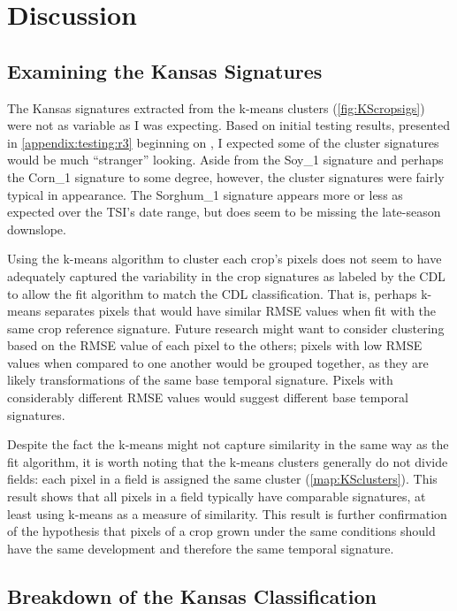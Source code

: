 \chapter{Discussion}
\label{discussion}

\section{Examining the Kansas Signatures}
\label{discussion:kssigs}

The Kansas signatures extracted from the k-means clusters (\autoref{fig:KScropsigs}) were not as variable as I was expecting. Based on initial testing results, presented in \autoref{appendix:testing:r3} beginning on , I expected some of the cluster signatures would be much ``stranger'' looking. Aside from the Soy\_1 signature and perhaps the Corn\_1 signature to some degree, however, the cluster signatures were fairly typical in appearance. The Sorghum\_1 signature appears more or less as expected over the TSI's date range, but does seem to be missing the late-season downslope.

Using the k-means algorithm to cluster each crop's pixels does not seem to have adequately captured the variability in the crop signatures as labeled by the CDL to allow the fit algorithm to match the CDL classification. That is, perhaps k-means separates pixels that would have similar RMSE values when fit with the same crop reference signature. Future research might want to consider clustering based on the RMSE value of each pixel to the others; pixels with low RMSE values when compared to one another would be grouped together, as they are likely transformations of the same base temporal signature. Pixels with considerably different RMSE values would suggest different base temporal signatures.

Despite the fact the k-means might not capture similarity in the same way as the fit algorithm, it is worth noting that the k-means clusters generally do not divide fields: each pixel in a field is assigned the same cluster (\autoref{map:KSclusters}). This result shows that all pixels in a field typically have comparable signatures, at least using k-means as a measure of similarity. This result is further confirmation of the hypothesis that pixels of a crop grown under the same conditions should have the same development and therefore the same temporal signature.

\section{Breakdown of the Kansas Classification}
\label{discussion:ksclassification}

